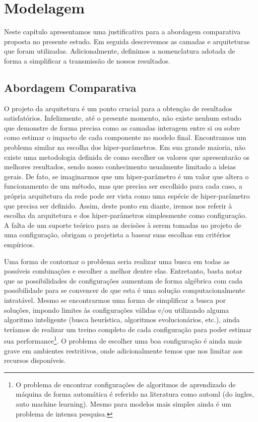 \chapter{Modelagem}\label{cap:modelagem}

Neste capítulo apresentamos uma justificativa para a abordagem comparativa proposta no presente estudo. Em seguida descrevemos as camadas e arquiteturas que foram utilizadas. Adicionalmente, definimos a nomenclatura adotada de forma a simplificar a transmissão de nossos resultados.  

\section{Abordagem Comparativa}\label{sec:abordagem}

O projeto da arquitetura é um ponto crucial para a obtenção de resultados satisfatórios. Infelizmente, até o presente momento, não existe nenhum estudo que demonstre de forma precisa como as camadas interagem entre si ou sobre como estimar o impacto de cada componente no modelo final. Encontramos um problema similar na escolha dos hiper-parâmetros. Em sua grande maioria, não existe uma metodologia definida de como escolher os valores que apresentarão os melhores resultados, sendo nosso conhecimento usualmente limitado a ideias gerais. De fato, se imaginarmos que um hiper-parâmetro é um valor que altera o funcionamento de um método, mas que precisa ser escolhido para cada caso, a própria arquitetura da rede pode ser vista como uma espécie de hiper-parâmetro que precisa ser definido. Assim, deste ponto em diante, iremos nos referir à escolha da arquitetura e dos hiper-parâmetros simplesmente como configuração. A falta de um suporte teórico para as decisões à serem tomadas no projeto de uma configuração, obrigam o projetista a basear suas escolhas em critérios empíricos.

Uma forma de contornar o problema seria realizar uma busca em todas as possíveis combinações e escolher a melhor dentre elas. Entretanto, basta notar que as possibilidades de configurações aumentam de forma algébrica com cada possibilidade para se convencer de que esta é uma solução computacionalmente intratável. Mesmo se encontrarmos uma forma de simplificar a busca por soluções, impondo limites às configurações válidas e/ou utilizando alguma algoritmo inteligente (busca heurística, algoritmos evolucionários, etc.), ainda teríamos de realizar um treino completo de cada configuração para poder estimar sua performance\footnote{O problema de encontrar configurações de algoritmos de aprendizado de máquina de forma automática é referido na literatura como automl (do ingles, auto machine learning). Mesmo para modelos mais simples ainda é um problema de intensa pesquisa.}. O problema de escolher uma boa configuração é ainda mais grave em ambientes restritivos, onde adicionalmente temos que nos limitar aos recursos disponíveis. 

